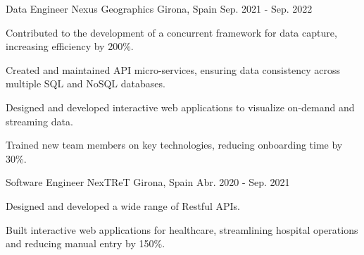 \begin{cventries}
      \cventry
      {Data Engineer} %
      {Nexus Geographics} %
      {Girona, Spain} %
      {Sep. 2021 - Sep. 2022} %
      {
        \begin{cvitems}
        \item {Contributed to the development of a concurrent framework for data capture, increasing efficiency by 200\%.}
        \item {Created and maintained API micro-services, ensuring data consistency across multiple SQL and NoSQL databases.}
        \item {Designed and developed interactive web applications to visualize
          on-demand and streaming data.}
        \item {Trained new team members on key technologies, reducing onboarding time by 30\%.}
        \end{cvitems}
      }


      \cventry
      {Software Engineer} %
      {NexTReT} %
      {Girona, Spain} %
      {Abr. 2020 - Sep. 2021} %
      {
        \begin{cvitems}
        \item {Designed and developed a wide range of Restful APIs.}
        \item {Built interactive web applications for healthcare, streamlining hospital operations and reducing manual entry by 150\%.}
        \end{cvitems}
      }

  \end{cventries}
